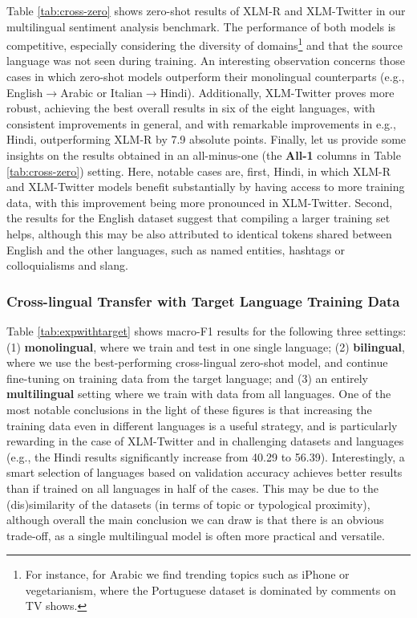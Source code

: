 \documentclass[10pt, a4paper]{article}
\begin{document}
Table \ref{tab:cross-zero} shows zero-shot results of XLM-R and XLM-Twitter in our multilingual sentiment analysis benchmark. The performance of both models is competitive, especially considering the diversity of domains\footnote{For instance, for Arabic we find trending topics such as iPhone or vegetarianism, where the Portuguese dataset is dominated by comments on TV shows.} and that the source language was not seen during training. An interesting observation concerns those cases in which zero-shot models outperform their monolingual counterparts (e.g., English$	\rightarrow$Arabic or Italian$\rightarrow$Hindi). Additionally, XLM-Twitter proves more robust, achieving the best overall results in six of the eight languages, with consistent improvements in general, and with remarkable improvements in e.g., Hindi, outperforming XLM-R by 7.9 absolute points. Finally, let us provide some insights on the results obtained in an all-minus-one (the \textbf{All-1} columns in Table \ref{tab:cross-zero}) setting. Here, notable cases are, first, Hindi, in which XLM-R and XLM-Twitter models benefit substantially by having access to more training data, with this improvement being more pronounced in XLM-Twitter. Second, the results for the English dataset suggest that compiling a larger training set helps, although this may be also attributed to identical tokens shared between English and the other languages, such as named entities, hashtags or colloquialisms and slang.
 
 

 
 
\subsubsection{Cross-lingual Transfer with Target Language Training Data}
\label{sec:withtarget}

\vspace{1ex plus 0.5ex}

Table \ref{tab:expwithtarget} shows macro-F1 results for the following three settings: (1) \textbf{monolingual}, where we train and test in one single language; (2) \textbf{bilingual}, where we use the best-performing cross-lingual zero-shot model, and continue fine-tuning on training data from the target language; and (3) an entirely \textbf{multilingual} setting where we train with data from all languages. One of the most notable conclusions in the light of these figures is that increasing the training data even in different languages is a useful strategy, and is particularly rewarding in the case of XLM-Twitter and in challenging datasets and languages (e.g., the Hindi results significantly increase from 40.29 to 56.39). Interestingly, a smart selection of languages based on validation accuracy achieves better results than if trained on all languages in half of the cases. This may be due to the (dis)similarity of the datasets (in terms of topic or typological proximity), although overall the main conclusion we can draw is that there is an obvious trade-off, as a single multilingual model is often more practical and versatile. 
\end{document}
